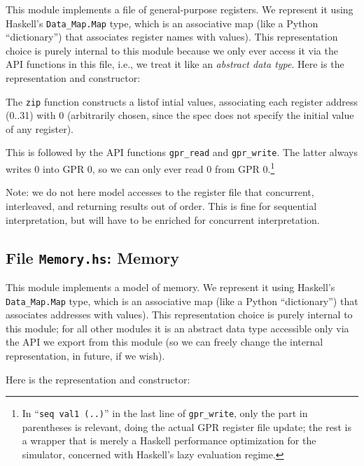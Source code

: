 \documentclass[11pt]{article}
\begin{document}
This module implements a file of general-purpose registers.  We
represent it using Haskell's \verb|Data_Map.Map| type, which is an
associative map (like a Python ``dictionary'') that associates
register names with values).  This representation choice is purely
internal to this module because we only ever access it via the API
functions in this file, i.e., we treat it like an \emph{abstract data
type}.  Here is the representation and constructor:



The \verb|zip| function constructs a listof intial values, associating
each register address (0..31) with 0 (arbitrarily chosen, since the
spec does not specify the initial value of any register).

This is followed by the API functions \verb|gpr_read| and
\verb|gpr_write|.  The latter always writes 0 into GPR 0, so we can
only ever read 0 from GPR 0.\footnote{In ``{\tt seq~val1~(..)}'' in
the last line of {\tt gpr\_write}, only the part in parentheses is
relevant, doing the actual GPR register file update; the rest is a
wrapper that is merely a Haskell performance optimization for the
simulator, concerned with Haskell's lazy evaluation regime.}

Note: we do not here model accesses to the register file that
concurrent, interleaved, and returning results out of order.  This is
fine for sequential interpretation, but will have to be enriched for
concurrent interpretation.


\subsection{File {\tt Memory.hs}: Memory}

\label{sec_memory}

This module implements a model of memory.  We represent it using
Haskell's \verb|Data_Map.Map| type, which is an associative map (like
a Python ``dictionary'') that associates addresses with values).  This
representation choice is purely internal to this module; for all other
modules it is an abstract data type accessible only via the API we
export from this module (so we can freely change the internal
representation, in future, if we wish).

Here is the representation and constructor:


\end{document}

